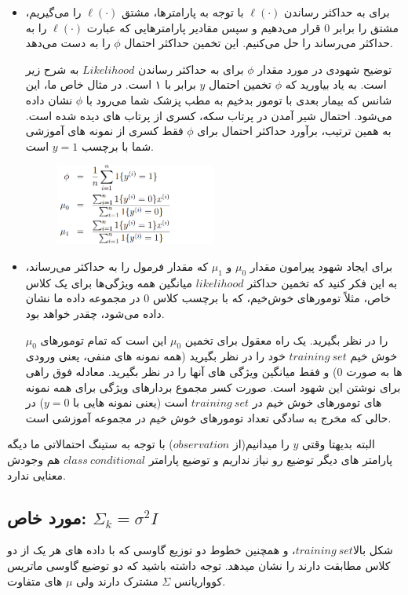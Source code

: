 \documentclass[12pt]{article}
\begin{document}
\begin{itemize}
    \item برای به حداکثر رساندن $\ell(\cdot)$ با توجه به پارامترها، مشتق $\ell(\cdot)$ را می‌گیریم، مشتق را برابر 0 قرار می‌دهیم و سپس مقادیر پارامترهایی که عبارت $\ell(\cdot)$ را به حداکثر می‌رساند را حل می‌کنیم. این تخمین حداکثر احتمال $\phi$ را به دست می‌دهد.

    توضیح شهودی در مورد مقدار \( \phi \) برای به حداکثر رساندن $Likelihood$ به شرح زیر است. به یاد بیاورید که \( \phi \) تخمین احتمال \( y \) برابر با ۱ است. در مثال خاص ما، این شانس که بیمار بعدی با تومور بدخیم به مطب پزشک شما می‌رود با \( \phi \) نشان داده می‌شود. احتمال شیر آمدن در پرتاب سکه، کسری از پرتاب های دیده شده است. به همین ترتیب، برآورد حداکثر احتمال برای \( \phi \) فقط کسری از نمونه های آموزشی شما با برچسب \( y=1 \) است.
    \begin{figure}[h]
      \centering
      \includegraphics[width=0.5\textwidth]{figs/2.png}
      \label{2}
    \end{figure}
    \item برای ایجاد شهود پیرامون مقدار $\mu_0$ و $\mu_1$ که مقدار فرمول را به حداکثر می‌رساند، به این فکر کنید که تخمین حداکثر $likelihood$ میانگین همه ویژگی‌ها برای یک کلاس خاص، مثلاً تومورهای خوش‌خیم، که با برچسب کلاس $0$ در مجموعه داده ما نشان داده می‌شود، چقدر خواهد بود.

    $\mu_0$ را در نظر بگیرید. یک راه معقول برای تخمین $\mu_0$ این است که تمام تومورهای خوش خیم $training\:set$ خود را در نظر بگیرید (همه نمونه های منفی، یعنی ورودی ها به صورت 0) و فقط میانگین ویژگی های آنها را در نظر بگیرید. معادله فوق راهی برای نوشتن این شهود است. صورت کسر مجموع بردارهای ویژگی برای همه نمونه های تومورهای خوش خیم در $training\:set$ است (یعنی نمونه هایی با $y=0$) در حالی که مخرج به سادگی تعداد تومورهای خوش خیم در مجموعه آموزشی است.


\end{itemize}


البته بدیهتا وقتی $y$ را میدانیم(از $observation$) با توجه به ستینگ احتمالاتی ما دیگه پارامتر های دیگر توضیع رو نیاز نداریم و توضیع پارامتر $class\:conditional$ هم وجودش معنایی ندارد.

\subsection*{مورد خاص: $\Sigma_{k}=\sigma^{2}I$ }
شکل بالا$training\:set$، و همچنین خطوط دو توزیع گاوسی که با داده های هر یک از دو کلاس مطابقت دارند را نشان میدهد. توجه داشته باشید که دو توضیع گاوسی ماتریس کوواریانس $\Sigma$ مشترک دارند ولی $\mu$ های متفاوت.
\end{document}

